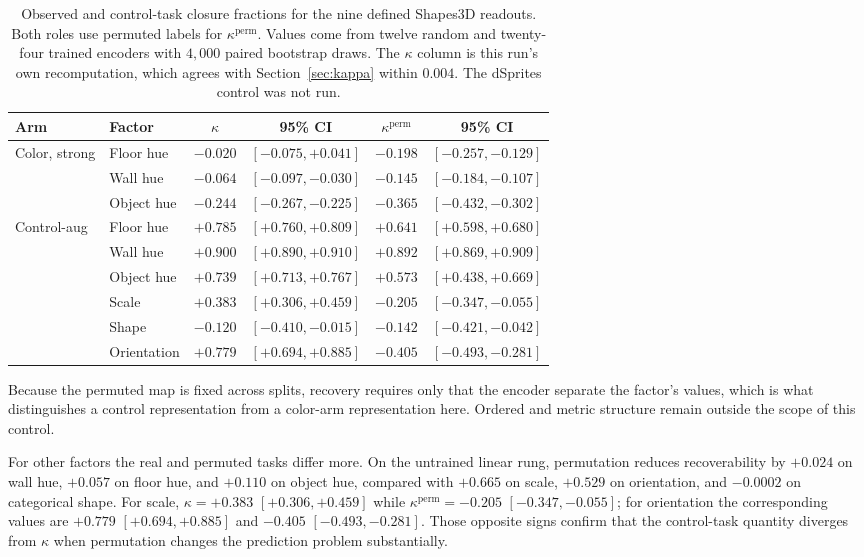 \documentclass[10pt]{article}
\begin{document}
\begin{table}[t]
\centering
\caption{Observed and control-task closure fractions for the nine defined Shapes3D readouts. Both
roles use permuted labels for $\kappa^{\mathrm{perm}}$. Values come from twelve random and
twenty-four
trained encoders with $4{,}000$ paired bootstrap draws. The $\kappa$ column is this run's own
recomputation, which agrees with Section~\ref{sec:kappa} within $0.004$. The dSprites control was
not run.}
\label{tab:kappanull}
\small
\begin{tabular}{l l cc cc}
\toprule
Arm & Factor & $\kappa$ & 95\% CI & $\kappa^{\mathrm{perm}}$ & 95\% CI \\
\midrule
Color, strong & Floor hue & $-0.020$ & $[-0.075, +0.041]$ & $-0.198$ & $[-0.257, -0.129]$ \\
               & Wall hue & $-0.064$ & $[-0.097, -0.030]$ & $-0.145$ & $[-0.184, -0.107]$ \\
               & Object hue & $-0.244$ & $[-0.267, -0.225]$ & $-0.365$ & $[-0.432, -0.302]$ \\
\midrule
Control-aug & Floor hue & $+0.785$ & $[+0.760, +0.809]$ & $+0.641$ & $[+0.598, +0.680]$ \\
            & Wall hue & $+0.900$ & $[+0.890, +0.910]$ & $+0.892$ & $[+0.869, +0.909]$ \\
            & Object hue & $+0.739$ & $[+0.713, +0.767]$ & $+0.573$ & $[+0.438, +0.669]$ \\
            & Scale & $+0.383$ & $[+0.306, +0.459]$ & $-0.205$ & $[-0.347, -0.055]$ \\
            & Shape & $-0.120$ & $[-0.410, -0.015]$ & $-0.142$ & $[-0.421, -0.042]$ \\
            & Orientation & $+0.779$ & $[+0.694, +0.885]$ & $-0.405$ & $[-0.493, -0.281]$ \\
\bottomrule
\end{tabular}
\end{table}

Because the permuted map is fixed across splits, recovery requires only that the encoder separate
the factor's values, which is what distinguishes a control representation from a color-arm
representation here. Ordered and metric structure remain outside the scope of this control.

For other factors the real and permuted tasks differ more. On the untrained linear rung, permutation
reduces recoverability by $+0.024$ on wall hue, $+0.057$ on floor hue, and $+0.110$ on object hue,
compared with $+0.665$ on scale, $+0.529$ on orientation, and $-0.0002$ on categorical shape. For
scale, $\kappa=+0.383$ $[+0.306,+0.459]$ while $\kappa^{\mathrm{perm}}=-0.205$
$[-0.347,-0.055]$; for orientation the corresponding values are $+0.779$
$[+0.694,+0.885]$ and $-0.405$ $[-0.493,-0.281]$. Those opposite signs confirm that the control-task
quantity diverges from $\kappa$ when permutation changes the prediction problem substantially.
\end{document}
